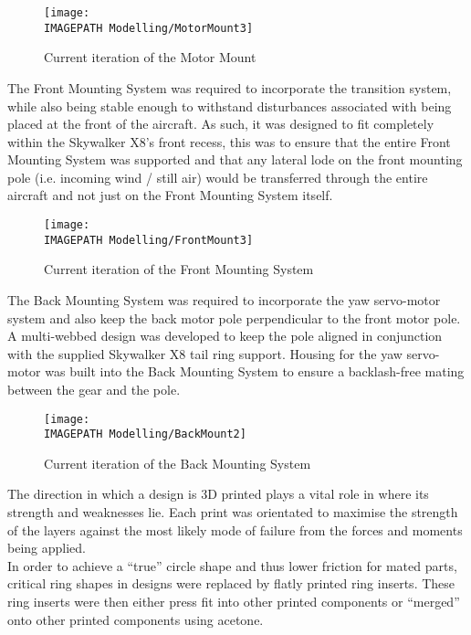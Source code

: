 \begin{figure}[!ht]
	\centering
	\texttt{[image: \\IMAGEPATH Modelling/MotorMount3]}
	\caption{Current iteration of the Motor Mount}
	\label{fig:designmotormount}
\end{figure}
	
The Front Mounting System was required to incorporate the transition system, while also being stable enough to withstand disturbances associated with being placed at the front of the aircraft. As such, it was designed to fit completely within the Skywalker X8's front recess, this was to ensure that the entire Front Mounting System was supported and that any lateral lode on the front mounting pole (i.e. incoming wind / still air) would be transferred through the entire aircraft and not just on the Front Mounting System itself.\\

\begin{figure}[!ht]
	\centering
	\texttt{[image: \\IMAGEPATH Modelling/FrontMount3]}
	\caption{Current iteration of the Front Mounting System}
	\label{fig:designfrontmount}
\end{figure}
	
The Back Mounting System was required to incorporate the yaw servo-motor system and also keep the back motor pole perpendicular to the front motor pole. A multi-webbed design was developed to keep the pole aligned in conjunction with the supplied Skywalker X8 tail ring support. Housing for the yaw servo-motor was built into the Back Mounting System to ensure a backlash-free mating between the gear and the pole.\\

\begin{figure}[!ht]
	\centering
	\texttt{[image: \\IMAGEPATH Modelling/BackMount2]}
	\caption{Current iteration of the Back Mounting System}
	\label{fig:designbackmount}
\end{figure}
		
The direction in which a design is 3D printed plays a vital role in where its strength and weaknesses lie. Each print was orientated to maximise the strength of the layers against the most likely mode of failure from the forces and moments being applied.\\

In order to achieve a ``true'' circle shape and thus lower friction for mated parts, critical ring shapes in designs were replaced by flatly printed ring inserts. These ring inserts were then either press fit into other printed components or ``merged'' onto other printed components using acetone. 


